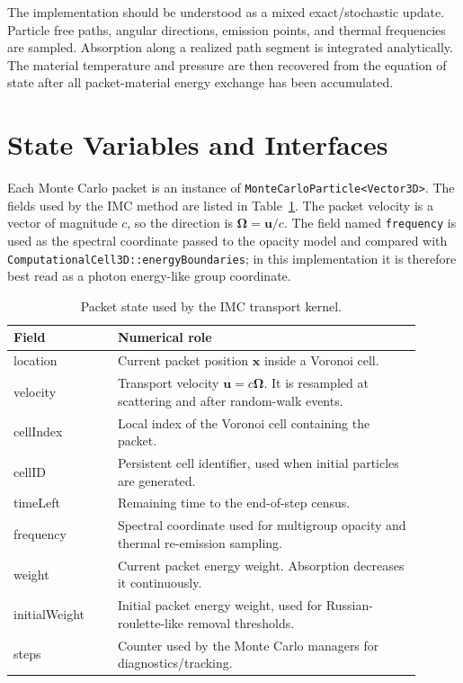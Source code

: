 \documentclass[11pt]{article}
\newcommand{\x}{\mathbf{x}}
\newcommand{\OmegaVec}{\boldsymbol{\Omega}}
\begin{document}
The implementation should be understood as a mixed exact/stochastic update.
Particle free paths, angular directions, emission points, and thermal
frequencies are sampled. Absorption along a realized path segment is integrated
analytically. The material temperature and pressure are then recovered from the
equation of state after all packet-material energy exchange has been accumulated.

\section{State Variables and Interfaces}

Each Monte Carlo packet is an instance of
\texttt{MonteCarloParticle<Vector3D>}. The fields used by the
IMC method are listed in Table~\ref{tab:packet-state}. The packet velocity is a
vector of magnitude \(c\), so the direction is
\(\OmegaVec=\mathbf{u}/c\). The field named \texttt{frequency} is used as the
spectral coordinate passed to the opacity model and compared with
\texttt{ComputationalCell3D::energyBoundaries}; in this implementation it is
therefore best read as a photon energy-like group coordinate.

\begin{table}[htbp]
\centering
\caption{Packet state used by the IMC transport kernel.}
\label{tab:packet-state}
\begin{tabular}{>{\ttfamily}p{0.23\linewidth}p{0.67\linewidth}}
\toprule
Field & Numerical role \\
\midrule
location & Current packet position \(\x\) inside a Voronoi cell. \\
velocity & Transport velocity \(\mathbf{u}=c\OmegaVec\). It is resampled at scattering and after random-walk events. \\
cellIndex & Local index of the Voronoi cell containing the packet. \\
cellID & Persistent cell identifier, used when initial particles are generated. \\
timeLeft & Remaining time to the end-of-step census. \\
frequency & Spectral coordinate used for multigroup opacity and thermal re-emission sampling. \\
weight & Current packet energy weight. Absorption decreases it continuously. \\
initialWeight & Initial packet energy weight, used for Russian-roulette-like removal thresholds. \\
steps & Counter used by the Monte Carlo managers for diagnostics/tracking. \\
\bottomrule
\end{tabular}
\end{table}
\end{document}
